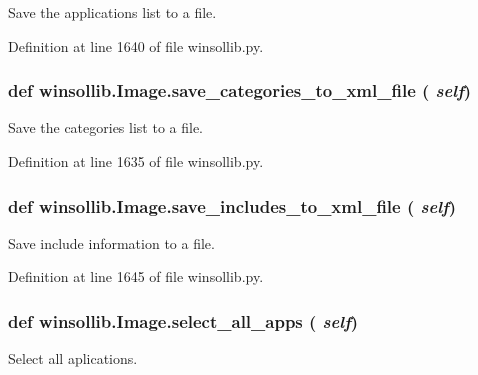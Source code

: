 Save the applications list to a file. 



Definition at line 1640 of file winsollib.py.\hypertarget{classwinsollib_1_1Image_0b75dfc2d45b94ad98990005093aeccf}{
\subsubsection[save\_\-categories\_\-to\_\-xml\_\-file]{\setlength{\rightskip}{0pt plus 5cm}def winsollib.Image.save\_\-categories\_\-to\_\-xml\_\-file ( {\em self})}}
\label{classwinsollib_1_1Image_0b75dfc2d45b94ad98990005093aeccf}


Save the categories list to a file. 



Definition at line 1635 of file winsollib.py.\hypertarget{classwinsollib_1_1Image_2d5c8e0ad2d904634ecb3688576ef25d}{
\subsubsection[save\_\-includes\_\-to\_\-xml\_\-file]{\setlength{\rightskip}{0pt plus 5cm}def winsollib.Image.save\_\-includes\_\-to\_\-xml\_\-file ( {\em self})}}
\label{classwinsollib_1_1Image_2d5c8e0ad2d904634ecb3688576ef25d}


Save include information to a file. 



Definition at line 1645 of file winsollib.py.\hypertarget{classwinsollib_1_1Image_51cdfffe314b134cada140ae639d27de}{
\subsubsection[select\_\-all\_\-apps]{\setlength{\rightskip}{0pt plus 5cm}def winsollib.Image.select\_\-all\_\-apps ( {\em self})}}
\label{classwinsollib_1_1Image_51cdfffe314b134cada140ae639d27de}


Select all aplications. 



